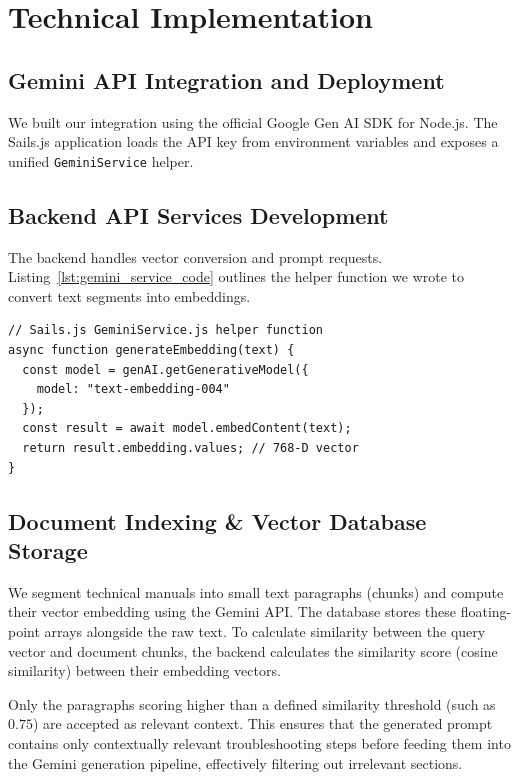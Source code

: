 \documentclass[12pt,a4paper]{report}
\begin{document}
\section{Technical Implementation}

\subsection{Gemini API Integration and Deployment}

\label{lst:gemini_service}
We built our integration using the official Google Gen AI SDK for Node.js. The Sails.js application loads the API key from environment variables and exposes a unified \texttt{GeminiService} helper.

\subsection{Backend API Services Development}

The backend handles vector conversion and prompt requests. Listing~\ref{lst:gemini_service_code} outlines the helper function we wrote to convert text segments into embeddings.

\begin{verbatim}
// Sails.js GeminiService.js helper function
async function generateEmbedding(text) {
  const model = genAI.getGenerativeModel({
    model: "text-embedding-004"
  });
  const result = await model.embedContent(text);
  return result.embedding.values; // 768-D vector
}
\end{verbatim}
\label{lst:gemini_service_code}

\subsection{Document Indexing \& Vector Database Storage}

We segment technical manuals into small text paragraphs (chunks) and compute their vector embedding using the Gemini API. The database stores these floating-point arrays alongside the raw text. To calculate similarity between the query vector and document chunks, the backend calculates the similarity score (cosine similarity) between their embedding vectors. 

Only the paragraphs scoring higher than a defined similarity threshold (such as $0.75$) are accepted as relevant context. This ensures that the generated prompt contains only contextually relevant troubleshooting steps before feeding them into the Gemini generation pipeline, effectively filtering out irrelevant sections.
\end{document}
